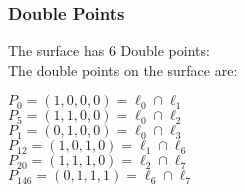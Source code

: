 \documentclass{article}
\begin{document}
{\subsubsection*{Double Points}
The surface has 6 Double points:\\
The double points on the surface are:\\
\begin{multicols}{2}
\noindent
$P_{0} = ( 1, 0, 0, 0 ) = \ell_{0} \cap \ell_{1} $\\
$P_{5} = ( 1, 1, 0, 0 ) = \ell_{0} \cap \ell_{2} $\\
$P_{1} = ( 0, 1, 0, 0 ) = \ell_{0} \cap \ell_{3} $\\
$P_{12} = ( 1, 0, 1, 0 ) = \ell_{1} \cap \ell_{6} $\\
$P_{20} = ( 1, 1, 1, 0 ) = \ell_{2} \cap \ell_{7} $\\
$P_{146} = ( 0, 1, 1, 1 ) = \ell_{6} \cap \ell_{7} $\\
\end{multicols}
}
\end{document}
